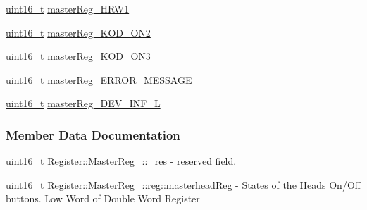 \begin{DoxyCompactItemize}
\item 
\mbox{\hyperlink{settings_8h_a017dd44e68049ffdd31500a8cd01ba68}{uint16\+\_\+t}} \mbox{\hyperlink{structRegister_1_1MasterReg___1_1reg_a476ef908b88923095d4854dcffa3e449}{master\+Reg\+\_\+\+H\+R\+W1}}
\item 
\mbox{\hyperlink{settings_8h_a017dd44e68049ffdd31500a8cd01ba68}{uint16\+\_\+t}} \mbox{\hyperlink{structRegister_1_1MasterReg___1_1reg_a81eeb4dd03eaf29676703e60f6dd5647}{master\+Reg\+\_\+\+K\+O\+D\+\_\+\+O\+N2}}
\item 
\mbox{\hyperlink{settings_8h_a017dd44e68049ffdd31500a8cd01ba68}{uint16\+\_\+t}} \mbox{\hyperlink{structRegister_1_1MasterReg___1_1reg_a9ba85903b95886b7a305553b8757f1f6}{master\+Reg\+\_\+\+K\+O\+D\+\_\+\+O\+N3}}
\item 
\mbox{\hyperlink{settings_8h_a017dd44e68049ffdd31500a8cd01ba68}{uint16\+\_\+t}} \mbox{\hyperlink{structRegister_1_1MasterReg___1_1reg_adda765befe3afc716d8ef69909ec92be}{master\+Reg\+\_\+\+E\+R\+R\+O\+R\+\_\+\+M\+E\+S\+S\+A\+GE}}
\item 
\mbox{\hyperlink{settings_8h_a017dd44e68049ffdd31500a8cd01ba68}{uint16\+\_\+t}} \mbox{\hyperlink{structRegister_1_1MasterReg___1_1reg_a253168290103d94eac25407b082deaae}{master\+Reg\+\_\+\+D\+E\+V\+\_\+\+I\+N\+F\+\_\+L}}
\end{DoxyCompactItemize}


\subsubsection{Member Data Documentation}
\mbox{\label{structRegister_1_1MasterReg___1_1reg_a06032ddd4d9b8205192c2828937cb51d}} 
{\footnotesize\ttfamily \mbox{\hyperlink{settings_8h_a017dd44e68049ffdd31500a8cd01ba68}{uint16\+\_\+t}} Register\+::\+Master\+Reg\+\_\+\+::\texorpdfstring{\+\_\+res}{\_res}} - reserved field.

\mbox{\label{structRegister_1_1MasterReg___1_1reg_a42c97dcb18a310e8d484dd2d9edc577d}} 
{\footnotesize\ttfamily \mbox{\hyperlink{settings_8h_a017dd44e68049ffdd31500a8cd01ba68}{uint16\+\_\+t}} Register\+::\+Master\+Reg\+\_\+\+::reg\+::\texorpdfstring{masterhead\+Reg}{masterheadReg}} - States of the Heads On/Off buttons. Low Word of Double Word Register

